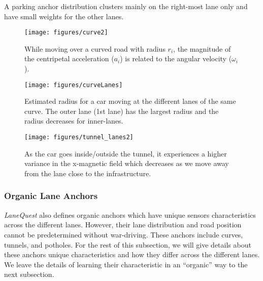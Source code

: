 \documentclass[10pt, conference, compsocconf]{IEEEtran}
\def \sys {\textit{LaneQuest}}
\newcommand{\figscale}{0.7}
\begin{document}
A parking anchor distribution clusters mainly on the right-most lane only and have small weights for the other lanes.

     \begin{figure}[!t]
\centering
\texttt{[image: figures/curve2]}
\caption{While moving over a curved road with radius $r_i$, the magnitude of the centripetal acceleration ($a_i$) is related to the angular velocity ($\omega_i$).}
\label{fig:curve_rule}
\end{figure}
\begin{figure}[!t]
    \centering
      \texttt{[image: figures/curveLanes]}
      \caption{Estimated radius for a car moving at the different lanes of the same curve. The outer lane (1st lane) has the largest radius and the radius decreases for inner-lanes. }
\label{fig:curve_rad}
\end{figure}

\begin{figure}[!t]
\centering
\texttt{[image: figures/tunnel\_lanes2]}
\caption{\small As the car goes inside/outside the tunnel, it experiences a higher variance in the x-magnetic field which decreases as we move away from the lane close to the infrastructure.
}
\label{fig:tunnel_lanes_ex}
\end{figure}
\subsubsection{Organic Lane Anchors}\label{sec:curve_lane}
\sys{} also defines organic anchors which have unique sensors characteristics across the different lanes. However, their lane distribution and road position cannot be predetermined without war-driving. These anchors include curves, tunnels, and potholes. For the rest of this subsection, we will give details about these anchors unique characteristics and how they differ across the different lanes. We leave the details of learning their characteristic in an ``organic'' way to the next subsection.
\end{document}

